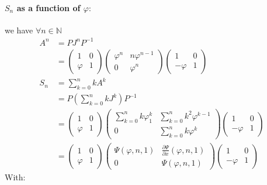 \documentclass[]{article}
\begin{document}
\paragraph{$S_n$ as a function of $\varphi:$}
we have $\forall n\in\mathbb{N}$
\begin{align*}
	A^n&=PJ^nP^{-1}\\
	&=\begin{pmatrix}
		1 & 0 \\ \varphi & 1 
	\end{pmatrix} \begin{pmatrix}
		\varphi^n & n\varphi^{n-1} \\ 0 & \varphi^n
	\end{pmatrix}\begin{pmatrix}
		1 & 0 \\ -\varphi & 1
	\end{pmatrix} \\
	S_n&= \sum_{k=0}^n k A^k \\
	&= P\left(\sum_{k=0}^{n} kJ^k\right)P^{-1}\\
	&= \begin{pmatrix}
		1 & 0 \\ \varphi & 1 
	\end{pmatrix} \begin{pmatrix}
		\sum_{k=0}^nk\varphi_1^k& \sum_{k=0}^n k^2 \varphi^{k-1} \\ 0 & \sum_{k=0}^nk \varphi^k
	\end{pmatrix}\begin{pmatrix}
		1 & 0 \\ -\varphi & 1
	\end{pmatrix} \\ 
	&= \begin{pmatrix}
		1 & 0 \\ \varphi & 1 
	\end{pmatrix} \begin{pmatrix}
		\Psi(\varphi,n,1)& \frac{\partial\Psi}{\partial x}(\varphi,n,1) \\ 0 & \Psi(\varphi,n,1)
	\end{pmatrix}\begin{pmatrix}
		1 & 0 \\ -\varphi & 1
	\end{pmatrix}
\end{align*}
With:
\end{document}
